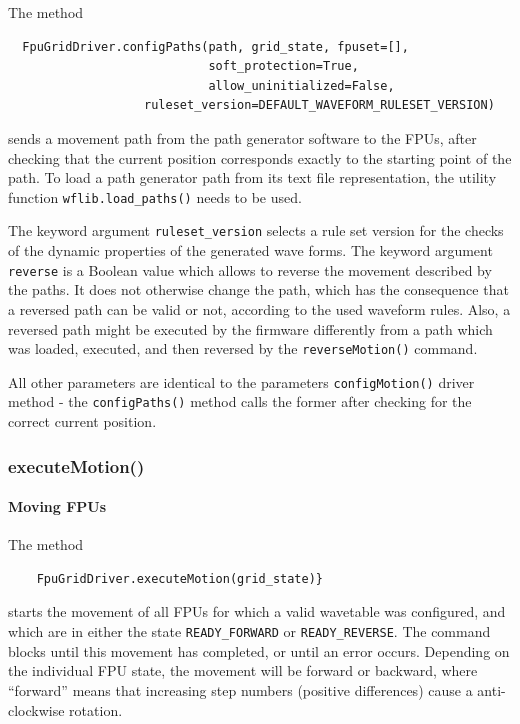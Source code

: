 \documentclass[11pt,a4paper]{scrartcl}
\begin{document}
The method
\begin{verbatim}
  FpuGridDriver.configPaths(path, grid_state, fpuset=[],
                            soft_protection=True,
                            allow_uninitialized=False,
                   ruleset_version=DEFAULT_WAVEFORM_RULESET_VERSION)
\end{verbatim}
sends a movement path from the path generator software to the FPUs,
after checking that the current position corresponds exactly to the
starting point of the path.  To load a path generator path from its
text file representation, the utility function
\texttt{wflib.load\_paths()} needs to be used.

The keyword argument \texttt{ruleset\_version} selects a rule set
version for the checks of the dynamic properties of the generated wave
forms. The keyword argument \texttt{reverse} is a Boolean value which
allows to reverse the movement described by the paths. It does not
otherwise change the path, which has the consequence that a reversed
path can be valid or not, according to the used waveform rules. Also,
a reversed path might be executed by the firmware differently from a
path which was loaded, executed, and then reversed by the
\texttt{reverseMotion()} command.

All other parameters are identical to the parameters
\texttt{configMotion()} driver method - the \texttt{configPaths()}
method calls the former after checking for the correct current
position.


\subsubsection{executeMotion()}

\paragraph{Moving FPUs}

\begin{sloppypar}
  The method
  \begin{verbatim}
    FpuGridDriver.executeMotion(grid_state)}
  \end{verbatim}
  starts the movement of all FPUs for which a valid wavetable was
  configured, and which are in either the state
  \texttt{READY\_FORWARD} or \texttt{READY\_REVERSE}. The command
  blocks until this movement has completed, or until an error
  occurs. Depending on the individual FPU state, the movement will be
  forward or backward, where ``forward'' means that increasing step
  numbers (positive differences) cause a anti-clockwise rotation.
\end{sloppypar}
\end{document}
